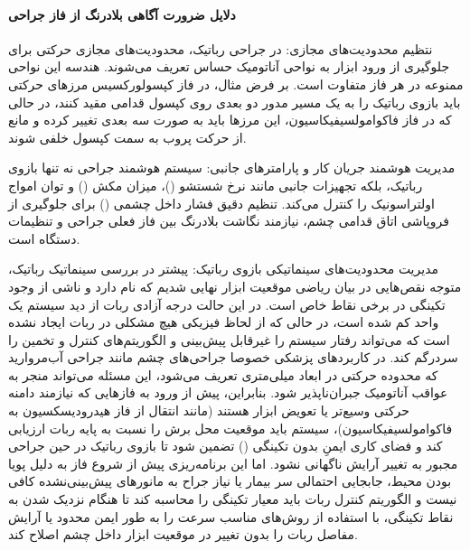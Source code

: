 \documentclass{article}
\begin{document}
\paragraph{دلایل ضرورت آگاهی بلادرنگ از فاز جراحی} \mbox{}
\begin{description}
\item نتظیم محدودیت‌های مجازی:
در جراحی رباتیک، محدودیت‌های مجازی حرکتی برای جلوگیری از ورود ابزار به نواحی آناتومیک حساس تعریف می‌شوند. هندسه این نواحی ممنوعه در هر فاز متفاوت است. بر فرض مثال، در فاز کپسولورکسیس مرزهای حرکتی باید بازوی رباتیک را به یک مسیر مدور دو بعدی روی کپسول قدامی مقید کنند، در حالی که در فاز فاکوامولسیفیکاسیون، این مرزها باید به صورت سه بعدی تغییر کرده و مانع از حرکت پروب به سمت کپسول خلفی شوند.

\item مدیریت هوشمند جریان کار و پارامترهای جانبی:
سیستم هوشمند جراحی نه تنها بازوی رباتیک، بلکه تجهیزات جانبی مانند نرخ شستشو ()، میزان مکش () و توان امواج اولتراسونیک را کنترل می‌کند. تنظیم دقیق فشار داخل چشمی () برای جلوگیری از فروپاشی اتاق قدامی چشم، نیازمند نگاشت بلادرنگ بین فاز فعلی جراحی و تنظیمات دستگاه است.

\item مدیریت محدودیت‌های سینماتیکی بازوی رباتیک:
پیشتر در بررسی سینماتیک رباتیک، متوجه نقص‌هایی در بیان ریاضی موقعیت ابزار نهایی  شدیم که  نام دارد و ناشی از وجود تکینگی  در برخی نقاط خاص است. در این حالت درجه آزادی ربات از دید سیستم یک واحد کم شده است، در حالی که از لحاظ فیزیکی هیچ مشکلی در ربات ایجاد نشده است که می‌تواند رفتار سیستم را غیرقابل پیش‌بینی و الگوریتم‌های کنترل و تخمین را سردرگم کند. در کاربردهای پزشکی خصوصا جراحی‌های چشم مانند جراحی آب‌مروارید که محدوده حرکتی در ابعاد میلی‌متری تعریف می‌شود، این مسئله می‌تواند منجر به عواقب آناتومیک جبران‌ناپذیر شود. 
بنابراین، پیش از ورود به فازهایی که نیازمند دامنه حرکتی وسیع‌تر یا تعویض ابزار هستند (مانند انتقال از فاز هیدرودیسکسیون به فاکوامولسیفیکاسیون)، سیستم باید موقعیت محل برش را نسبت به پایه ربات ارزیابی کند و فضای کاری ایمنِ بدون تکینگی () تضمین شود تا بازوی رباتیک در حین جراحی مجبور به تغییر آرایش ناگهانی نشود. اما این برنامه‌ریزی پیش از شروع فاز به دلیل پویا  بودن محیط، جابجایی احتمالی سر بیمار یا نیاز جراح به مانورهای پیش‌بینی‌نشده کافی نیست و الگوریتم کنترل ربات باید معیار تکینگی را محاسبه کند تا هنگام نزدیک شدن به نقاط تکینگی، با استفاده از روش‌های مناسب سرعت را به طور ایمن محدود یا آرایش مفاصل ربات را بدون تغییر در موقعیت ابزار داخل چشم اصلاح کند.
\end{description}
\end{document}
